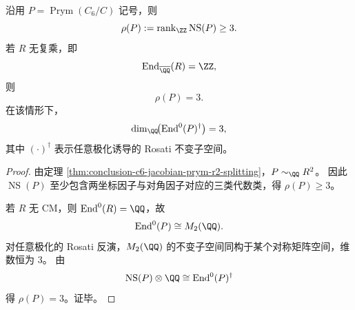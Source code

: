 \begin{proposition}\label{prop:conclusion-prym-ns-rank-lower-and-nocm-exact}
沿用 \(P=\operatorname{Prym}(C_6/C)\) 记号，则
\[
\rho(P):=\operatorname{rank}_{\ZZ}\operatorname{NS}(P)\ge 3.
\]
若 \(R\) 无复乘，即
\[
\operatorname{End}_{\overline{\QQ}}(R)=\ZZ,
\]
则
\[
\rho(P)=3.
\]
在该情形下，
\[
\dim_{\QQ}\!\bigl(\operatorname{End}^0(P)^{\dagger}\bigr)=3,
\]
其中 \((\cdot)^{\dagger}\) 表示任意极化诱导的 Rosati 不变子空间。
\end{proposition}
\begin{proof}
由定理 \ref{thm:conclusion-c6-jacobian-prym-r2-splitting}，\(P\sim_{\QQ}R^2\)。
因此 \(\operatorname{NS}(P)\) 至少包含两坐标因子与对角因子对应的三类代数类，得 \(\rho(P)\ge 3\)。

若 \(R\) 无 CM，则 \(\operatorname{End}^0(R)=\QQ\)，故
\[
\operatorname{End}^0(P)\cong M_2(\QQ).
\]
对任意极化的 Rosati 反演，\(M_2(\QQ)\) 的不变子空间同构于某个对称矩阵空间，维数恒为 \(3\)。
由
\[
\operatorname{NS}(P)\otimes\QQ\cong \operatorname{End}^0(P)^{\dagger}
\]
得 \(\rho(P)=3\)。证毕。
\end{proof}
